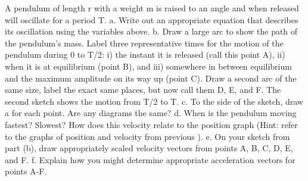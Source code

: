 \label{fnt8.3.1-1}

A pendulum of length r with a weight m is raised to an angle \thetamax and when released will oscillate for a period T.
a.	Write out an appropriate equation that describes its oscillation using the variables above.
b.	Draw a large arc to show the path of the pendulum's mass.  Label three representative times for the motion of the pendulum during 0 to T/2: i) the instant it is released (call this point A), ii) when it is at equilibrium (point B), and iii) somewhere in between equilibrium and the maximum amplitude on its way up (point C).  Draw a second arc of the same size, label the exact same places, but now call them D, E, and F.  The second sketch shows the motion from T/2 to T.
c.	To the side of the sketch, draw a \forcediag{} for each point.  Are any diagrams the same?
d.	When is the pendulum moving fastest?  Slowest?  How does this velocity relate to the position graph (Hint: refer to the graphs of position and velocity from previous \FNTs).
e.	On your sketch from part (b), draw appropriately scaled velocity vectors from points A, B, C, D, E, and F.
f.	Explain how you might determine appropriate acceleration vectors for points A-F.